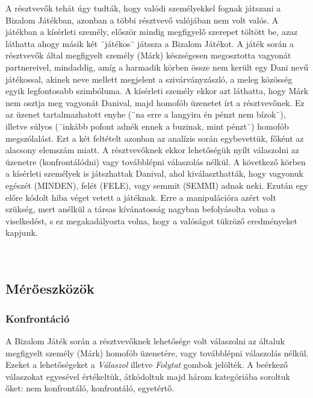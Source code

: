 A résztvevők tehát úgy tudták, hogy valódi személyekkel fognak játszani a Bizalom Játékban, azonban a többi résztvevő valójában nem volt valós. A játékban a kísérleti személy, először mindig megfigyelő szerepet töltött be, azaz láthatta ahogy másik két ¨játékos¨ játssza a Bizalom Játékot. A játék során a résztvevők által megfigyelt személy (Márk) készségesen megosztotta vagyonát partnereivel, mindaddig, amíg a harmadik kör\-ben össze nem került egy Dani nevű játékossal, akinek neve mellett megjelent a szivárvány\-zászló, a meleg közösség egyik legfontosabb szimbóluma. A kísérleti személy ekkor azt láthatta, hogy Márk nem osztja meg vagyonát Danival, majd homofób üzenetet írt a résztvevőnek. Ez az üzenet tartalmazhatott enyhe (¨na erre a langyira én pénzt nem bízok¨), illetve súlyos (¨inkább pofont adnék ennek a buzinak, mint pénzt¨) homofób megszólalást. Ezt a két feltételt azonban az analízis során egybevettük, főként az alacsony elemszám miatt. A résztvevőknek ekkor lehetőségük nyílt válaszolni az üzenetre (konfrontálódni) vagy továbblépni válaszolás nélkül. A következő körben a kísérleti személyek is játszhattak Danival, ahol kiválaszthatták, hogy vagyonuk egészét (MINDEN), felét (FELE), vagy semmit (SEMMI) adnak neki. Ezután egy előre kódolt hiba véget vetett a játéknak. Erre a manipulációra azért volt szükség, mert anélkül a társas kívánatosság nagyban befolyásolta volna a viselkedést, s  ez megakadályozta volna, hogy a valóságot tükröző eredményeket kapjunk.
\\
\\
\\
\subsection{Mérőeszközök}

\subsubsection{Konfrontáció}
A Bizalom Játék során a résztvevőknek lehetősége volt válaszolni az általuk megfigyelt személy (Márk) homofób üzenetére, vagy továbblépni válaszolás nélkül. Ezeket a lehetőségeket a \textit{Válaszol} illetve \textit{Folytat}  gombok jelölték. A beérkező válaszokat egyesével értékeltük, átkódoltuk majd három kategóriába soroltuk őket: nem konfrontáló, konfrontáló, egyetértő.
